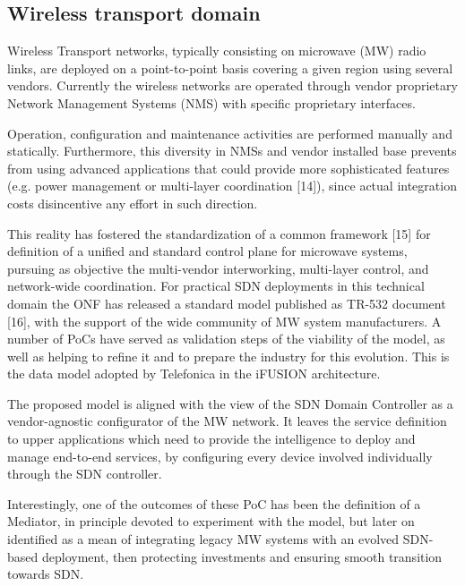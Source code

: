 \documentclass[a4paper,fleqn]{cas-dc}
\begin{document}
\subsection{Wireless transport domain}
\label{section:mw}
Wireless Transport networks, typically consisting on microwave (MW) radio links, are deployed on a point-to-point basis covering a given region using several vendors. Currently the wireless networks are operated through vendor proprietary Network Management Systems (NMS) with specific proprietary interfaces.

Operation, configuration and maintenance activities are performed manually and statically. Furthermore, this diversity in NMSs and vendor installed base prevents from using advanced applications that could provide more sophisticated features (e.g. power management or multi-layer coordination [14]), since actual integration costs disincentive any effort in such direction. 

This reality has fostered the standardization of a common framework [15] for definition of a unified and standard control plane for microwave systems, pursuing as objective the multi-vendor interworking, multi-layer control, and network-wide coordination.
For practical SDN deployments in this technical domain the ONF has released a standard model published as TR-532 document [16], with the support of the wide community of MW system manufacturers. A number of PoCs have served as validation steps of the viability of the model, as well as helping to refine it and to prepare the industry for this evolution. This is the data model adopted by Telefonica in the iFUSION architecture.

The proposed model is aligned with the view of the SDN Domain Controller as a vendor-agnostic configurator of the MW network. It leaves the service definition to upper applications which need to provide the intelligence to deploy and manage end-to-end services, by configuring every device involved individually through the SDN controller.

Interestingly, one of the outcomes of these PoC has been the definition of a Mediator, in principle devoted to experiment with the model, but later on identified as a mean of integrating legacy MW systems with an evolved SDN-based deployment, then protecting investments and ensuring smooth transition towards SDN.  
\end{document}
